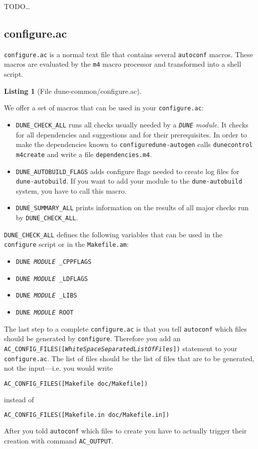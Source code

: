 \documentclass[11pt,a4paper,headinclude,footinclude,DIV16,normalheadings]{scrartcl}
\newtheorem{lst}{Listing}
\newcommand{\dune}{\texttt{DUNE}\xspace}
\newcommand{\autoconf}{\texttt{autoconf}\xspace}
\newcommand{\autogen}{\texttt{dune-autogen}\xspace}
\newcommand{\configure}{\texttt{configure}\xspace}
\newcommand{\configureac}{\texttt{configure.ac}\xspace}
\newcommand{\makefileam}{\texttt{Makefile.am}\xspace}
\begin{document}
TODO\dots{}

\subsection{configure.ac}
\label{configure.ac}

\configureac  is a normal text file that contains several \autoconf
macros. These macros are evaluated by the \texttt{m4} macro processor
and transformed into a shell script.

\begin{lst}[File dune-common/configure.ac] \mbox{}

\end{lst}

We offer a set of macros that can be used in your \configureac:

\begin{itemize}
\item \texttt{DUNE\_CHECK\_ALL}
  runs all checks usually needed by a {\em \dune module}.
  It checks for all dependencies and suggestions and for their
  prerequisites.
  In order to make the dependencies known to \configure \autogen calls
  \texttt{dunecontrol m4create} and write a file
  \texttt{dependencies.m4}.
\item \texttt{DUNE\_AUTOBUILD\_FLAGS}
  adds configure flags needed to create log files for
  \texttt{dune-autobuild}. If you want to add your module to the
  \texttt{dune-autobuild} system, you have to call this macro.
\item \texttt{DUNE\_SUMMARY\_ALL}
  prints information on the results of all major checks run by
  \texttt{DUNE\_CHECK\_ALL}.
\end{itemize}

\texttt{DUNE\_CHECK\_ALL} defines the following
variables that can be used in the \configure script or in the
\makefileam:

\begin{itemize}
\item \texttt{DUNE\textit{\,MODULE\,}\_CPPFLAGS}
\item \texttt{DUNE\textit{\,MODULE\,}\_LDFLAGS}
\item \texttt{DUNE\textit{\,MODULE\,}\_LIBS}
\item \texttt{DUNE\textit{\,MODULE\,}ROOT}
\end{itemize}

The last step to a complete \configureac is that you tell \autoconf
which files should be generated by \configure. Therefore you add an
\texttt{AC\_CONFIG\_FILES([\textit{WhiteSpaceSeparatedListOfFiles}])}
statement to your \configureac. The list of files should be the list
of files that are to be generated, not the input---i.e. you would
write
\begin{lstlisting}[language=make]
AC_CONFIG_FILES([Makefile doc/Makefile])
\end{lstlisting}
instead of
\begin{lstlisting}[language=make]
AC_CONFIG_FILES([Makefile.in doc/Makefile.in])
\end{lstlisting}
After you told \autoconf which files to create you have to actually
trigger their creation with command \texttt{AC\_OUTPUT}.
\end{document}
